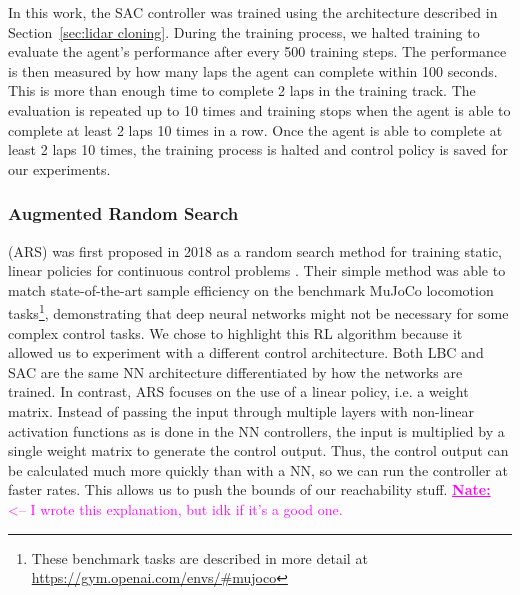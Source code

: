 \documentclass[manuscript,screen,review]{acmart}
\newcommand{\nate}[1]{\textcolor{magenta}{\textbf{\underline{Nate:}} #1}}
\begin{document}
In this work, the SAC controller was trained
using the architecture described in Section~\ref{sec:lidar cloning}. During the training process, we halted training to evaluate the agent's performance after every 500 training steps. The performance is then measured by how many laps the agent can complete within 100 seconds. This is more than enough time to complete 2 laps in the training track. The evaluation is repeated up to 10 times and training stops when the agent is able to complete at least 2 laps 10 times in a row. Once the agent is able to complete at least 2 laps 10 times, the training process is halted and control policy is saved for our experiments.

\subsubsection{Augmented Random Search} 
(ARS) was first proposed in 2018 as a random search method for training static, linear policies for continuous control problems \cite{mania2018simple}. Their simple method was able to match state-of-the-art sample efficiency on the benchmark MuJoCo locomotion tasks\footnote{These benchmark tasks are described in more detail at \url{https://gym.openai.com/envs/\#mujoco}}, demonstrating that deep neural networks might not be necessary for some complex control tasks. We chose to highlight this RL algorithm because %
it allowed us to experiment with a different control architecture. Both LBC and SAC are the same NN architecture differentiated by how the networks are trained. In contrast, ARS focuses on the use of a linear policy, i.e. a weight matrix. Instead of passing the input through multiple layers with non-linear activation functions as is done in the NN controllers, the input is multiplied by a single weight matrix to generate the control output. Thus, the control output can be calculated much more quickly than with a NN, so we can run the controller at faster rates. This allows us to push the bounds of our reachability stuff. \nate{<-- I wrote this explanation, but idk if it's a good one.}
\end{document}
